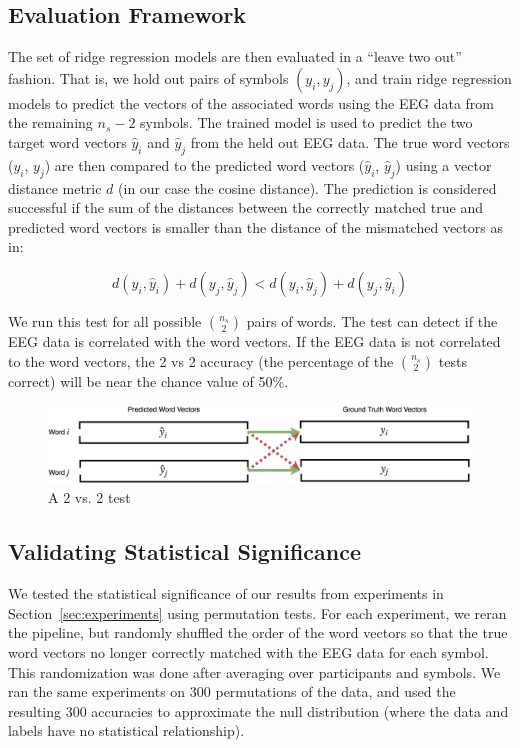 \subsection{Evaluation Framework}
The set of ridge regression models are then evaluated in a ``leave two out'' fashion. That is, we hold out pairs of symbols $(y_i, y_j)$, and train ridge regression models to predict the vectors of the associated words using the EEG data from the remaining $n_s-2$ symbols.  The trained model is used to predict the two target word vectors $\hat{y}_i$ and $\hat{y}_j$ from the held out EEG data. The true word vectors ($y_i$, $y_j$) are then compared to the predicted word vectors ($\hat{y}_i$, $\hat{y}_j$) using a vector distance metric $d$ (in our case the cosine distance). The prediction is considered successful if the sum of the distances between the correctly matched true and predicted word vectors is smaller than the distance of the mismatched vectors as in: 
  
\begin{equation}
  d(y_i, \hat{y}_i) + d(y_j, \hat{y}_j) < d(y_i, \hat{y}_j) + d(y_j, \hat{y}_i)
  \label{eq:2vs2}
\end{equation}
  
\noindent We run this test for all possible ${\binom{n_s}{2}}$ pairs of words. The \tvt test can detect if the EEG data is correlated with the word vectors. If the EEG data is not correlated to the word vectors, the 2 vs 2 accuracy (the percentage of the ${\binom{n_s}{2}}$ \tvt tests correct) will be  near the chance value of 50\%.

\begin{figure}[t]
  \centering
  \includegraphics{figures/2vs2}
  \caption{A 2 vs. 2 test}
  \label{fig:2vs2}
\end{figure}

\subsection{Validating Statistical Significance}
We tested the statistical significance of our results from experiments in Section~\ref{sec:experiments} using permutation tests. For each experiment, we reran the pipeline, but randomly shuffled the order of the word vectors so that the true word vectors no longer correctly matched with the EEG data for each symbol. This randomization was done after averaging over participants and symbols. We ran the same experiments on 300 permutations of the data, and used the resulting 300 \tvt accuracies to approximate the null distribution (where the data and labels have no statistical relationship). 
  

